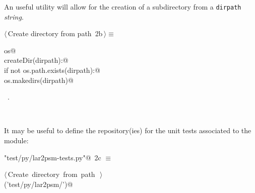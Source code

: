 \documentclass[11pt,oneside]{article}	%
\begin{document}
An useful utility will allow for the creation of a subdirectory from a \texttt{dirpath} \emph{string}.
\begin{flushleft} \small
\begin{minipage}{\linewidth} \label{scrap2}
\protect{}$\langle\,$Create directory from path\nobreak\ {\footnotesize 2b}$\,\rangle\equiv$
\vspace{-1ex}
\begin{list}{}{} \item
\mbox{}\verb@import os@\\
\mbox{}\verb@def createDir(dirpath):@\\
\mbox{}\verb@    if not os.path.exists(dirpath):@\\
\mbox{}\verb@        os.makedirs(dirpath)@\\
\mbox{}\verb@@{\NWsep}
\end{list}
\vspace{-1ex}
\footnotesize\addtolength{\baselineskip}{-1ex}
\begin{list}{}{\setlength{\itemsep}{-\parsep}\setlength{\itemindent}{-\leftmargin}}
\item \NWtxtMacroRefIn\ .
\end{list}
\end{minipage}\\[4ex]
\end{flushleft}

It may be useful to define the repository(ies) for the unit tests associated to the module:
\begin{flushleft} \small
\begin{minipage}{\linewidth} \label{scrap3}
\protect{}\verb@"test/py/lar2psm-tests.py"@\nobreak\ {\footnotesize 2c }$\equiv$
\vspace{-1ex}
\begin{list}{}{} \item
\mbox{}\verb@@\hbox{$\langle\,$Create directory from path\nobreak\ {\footnotesize {}}$\,\rangle$}\verb@@\\
\mbox{}\verb@createDir('test/py/lar2psm/')@\\
\mbox{}\verb@@{\NWsep}
\end{list}
\vspace{-2ex}
\end{minipage}\\[4ex]
\end{flushleft}
\end{document}
